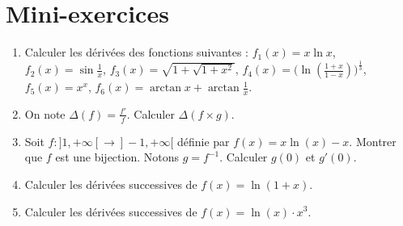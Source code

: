 \section*{Mini-exercices}


\begin{frame}
\begin{miniexercice}
\begin{enumerate}
  \item Calculer les dérivées des fonctions suivantes :
$f_1(x) = x\ln x$, $f_2(x)=\sin \frac 1x$, $f_3(x)=\sqrt{1+\sqrt{1+x^2}}$, $f_4(x)= \big(\ln(\frac{1+x}{1-x})\big)^{\frac13}$,
$f_5(x) = x^x$, $f_6(x) = \arctan x + \arctan \frac 1x$.
  \item On note $\Delta(f)=\frac{f'}{f}$. Calculer $\Delta(f\times g)$.
  \item Soit $f : ]1, +\infty[ \to ]-1, +\infty[$ définie par $f(x)= x\ln (x) - x$.
Montrer que $f$ est une bijection. Notons $g=f^{-1}$. Calculer $g(0)$ et $g'(0)$.
  \item Calculer les dérivées successives de $f(x)=\ln(1+x)$.
  \item Calculer les dérivées successives de $f(x)=\ln(x) \cdot x^3$.
\end{enumerate}
\end{miniexercice}
\end{frame}


